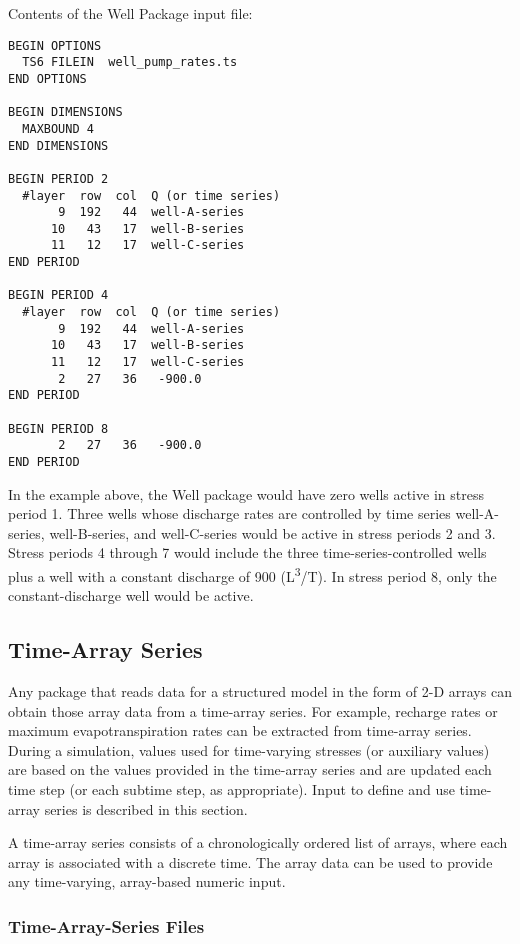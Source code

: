 Contents of the Well Package input file:
\begin{lstlisting}[style=inputfile]
BEGIN OPTIONS
  TS6 FILEIN  well_pump_rates.ts
END OPTIONS

BEGIN DIMENSIONS
  MAXBOUND 4
END DIMENSIONS

BEGIN PERIOD 2
  #layer  row  col  Q (or time series)
       9  192   44  well-A-series
      10   43   17  well-B-series
      11   12   17  well-C-series     
END PERIOD

BEGIN PERIOD 4
  #layer  row  col  Q (or time series)
       9  192   44  well-A-series
      10   43   17  well-B-series
      11   12   17  well-C-series     
       2   27   36   -900.0
END PERIOD

BEGIN PERIOD 8
       2   27   36   -900.0
END PERIOD
\end{lstlisting}

In the example above, the Well package would have zero wells active in stress period 1. Three wells whose discharge rates are controlled by time series well-A-series, well-B-series, and well-C-series would be active in stress periods 2 and 3. Stress periods 4 through 7 would include the three time-series-controlled wells plus a well with a constant discharge of 900 (L\textsuperscript{3}/T). In stress period 8, only the constant-discharge well would be active.

\subsection{Time-Array Series}

Any package that reads data for a structured model in the form of 2-D arrays can obtain those array data from a time-array series. For example, recharge rates or maximum evapotranspiration rates can be extracted from time-array series. During a simulation, values used for time-varying stresses (or auxiliary values) are based on the values provided in the time-array series and are updated each time step (or each subtime step, as appropriate). Input to define and use time-array series is described in this section. 

A time-array series consists of a chronologically ordered list of arrays, where each array is associated with a discrete time. The array data can be used to provide any time-varying, array-based numeric input.

\subsubsection{Time-Array-Series Files}

